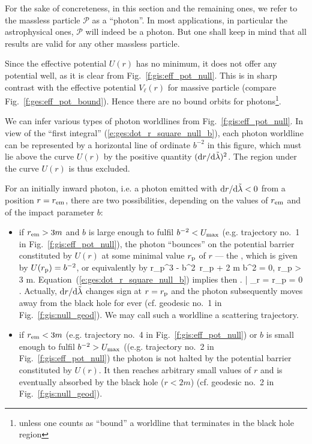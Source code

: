For the sake of concreteness, in this section and the remaining ones, we
refer to the massless particle $\mathscr{P}$ as a ``photon''. In most applications, in
particular the astrophysical ones, $\mathscr{P}$ will indeed be a photon.
But one shall keep in mind that all results are valid for any other massless
particle.

Since the effective potential
$U(r)$ has no minimum, it does not offer any potential well,
as it is clear from Fig.~\ref{f:gis:eff_pot_null}. This is in sharp contrast
with the effective potential $V_\ell(r)$ for massive particle
(compare Fig.~\ref{f:ges:eff_pot_bound}). Hence there are no bound orbits
for photons\footnote{unless one counts as ``bound'' a worldline that terminates in the
black hole region}.

We can infer various types of photon worldlines from Fig.~\ref{f:gis:eff_pot_null}.
In view of the ``first integral'' (\ref{e:ges:dot_r_square_null_b}),
each photon worldline can be represented by a horizontal line of ordinate
$b^{-2}$ in this figure, which must lie above the curve $U(r)$
by the positive quantity $({\mathrm{d} r}/{\mathrm{d}\tilde{\lambda}})^2$. The region under the curve
$U(r)$ is thus excluded.

For an initially inward photon, i.e. a photon emitted with ${\mathrm{d} r}/{\mathrm{d}\tilde{\lambda}} < 0$
from a position $r=r_{\rm em}$, there are
two possibilities, depending on the values of $r_{\rm em}$ and
of the impact parameter $b$:
\begin{itemize}
\item if $r_{\rm em} > 3 m$ and $b$ is large enough to fulfil $b^{-2} < U_{\rm max}$
(e.g. trajectory no.~1 in Fig.~\ref{f:gis:eff_pot_null}), the photon
``bounces'' on the potential barrier constituted by $U(r)$
at some minimal value  $r_{\rm p}$ of $r$ --- the ,
which is given by  $U(r_{\rm p}) = b^{-2}$, or equivalently by
\be \label{e:ges:r_per_null}
  r_{\rm p}^3 - b^2\, r_{\rm p} + 2 m b^2 = 0, \quad r_{\rm p} > 3 m.
\ee
Equation~(\ref{e:ges:dot_r_square_null_b})
implies then
\be
    \left.  \right| _{r = r_{\rm p}} = 0 .
\ee
Actually, $\mathrm{d} r / \mathrm{d}\tilde{\lambda}$ changes sign at $r = r_{\rm p}$ and
the photon subsequently moves away from the black hole for ever (cf. geodesic
no.~1 in Fig.~\ref{f:gis:null_geod}). We may call
such a worldline a scattering trajectory.
\item if $r_{\rm em} < 3 m$ (e.g. trajectory
no.~4 in Fig.~\ref{f:gis:eff_pot_null}) or $b$ is small enough to fulfil $b^{-2} > U_{\rm max}$ ((e.g. trajectory
no.~2 in Fig.~\ref{f:gis:eff_pot_null}) the photon
is not halted by the potential barrier constituted by $U(r)$. It then reaches arbitrary
small values of $r$ and is eventually absorbed by the black hole ($r < 2m$)
(cf. geodesic no.~2 in Fig.~\ref{f:gis:null_geod}).
\end{itemize}

